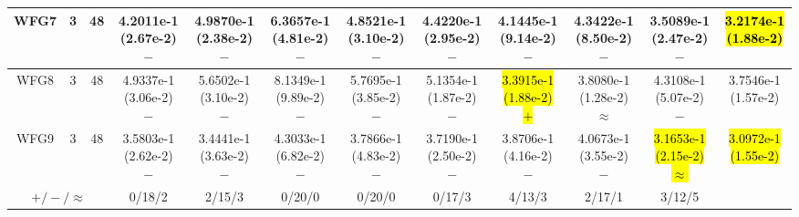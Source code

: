 \documentclass[journal]{IEEEtran}
\begin{document}
\begin{table*}[htbp]
\begin{tabular}{cccccccccccc}
\hline
\multirow{1}{*}{WFG7}&3&48&4.2011e-1 (2.67e-2) $-$&4.9870e-1 (2.38e-2) $-$&6.3657e-1 (4.81e-2) $-$&4.8521e-1 (3.10e-2) $-$&4.4220e-1 (2.95e-2) $-$&4.1445e-1 (9.14e-2) $-$&4.3422e-1 (8.50e-2) $-$&3.5089e-1 (2.47e-2) $-$&\hl{3.2174e-1 (1.88e-2)}\\
\hline
\multirow{1}{*}{WFG8}&3&48&4.9337e-1 (3.06e-2) $-$&5.6502e-1 (3.10e-2) $-$&8.1349e-1 (9.89e-2) $-$&5.7695e-1 (3.85e-2) $-$&5.1354e-1 (1.87e-2) $-$&\hl{3.3915e-1 (1.88e-2) $+$}&3.8080e-1 (1.28e-2) $\approx$&4.3108e-1 (5.07e-2) $-$&3.7546e-1 (1.57e-2)\\
\hline
\multirow{1}{*}{WFG9}&3&48&3.5803e-1 (2.62e-2) $-$&3.4441e-1 (3.63e-2) $-$&4.3033e-1 (6.82e-2) $-$&3.7866e-1 (4.83e-2) $-$&3.7190e-1 (2.50e-2) $-$&3.8706e-1 (4.16e-2) $-$&4.0673e-1 (3.55e-2) $-$&\hl{3.1653e-1 (2.15e-2) $\approx$}&\hl{3.0972e-1 (1.55e-2)}\\
\hline
\multicolumn{3}{c}{$+/-/\approx$}&0/18/2&2/15/3&0/20/0&0/20/0&0/17/3&4/13/3&2/17/1&3/12/5&\\
\bottomrule
\end{tabular}
\label{No Label}
\end{table*}
\end{document}
